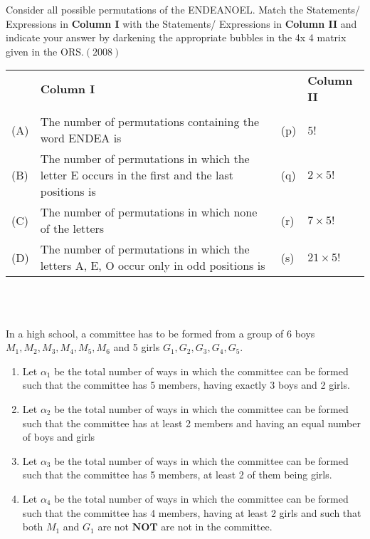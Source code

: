 \iffalse
  \title{Permutations And Combinations}
  \author{BALAJI B}
  \section{matrix-match}
\fi


    \item Consider all possible permutations of the ENDEANOEL. Match the Statements/ Expressions in
\textbf{Column I} with the Statements/ Expressions in \textbf{Column II} and indicate your answer by darkening
the appropriate bubbles in the 4x 4 matrix given in the ORS.\hfill $(2008)$\\  
    




\begin{tabular}{p{0.5cm}p{9cm}p{1.5cm}p{2cm}}
& \textbf{Column I } & & \textbf{Column II}\\ \\
 (A) & The number of permutations containing the word ENDEA is & \raggedleft (p) & 5! \\
    (B) & The number of permutations in which the letter E occurs in the first and the last positions is & \raggedleft(q) & $2\times{5!}$\\
    (C)& The number of permutations in which none of the letters & \raggedleft (r) &$7\times{5!}$\\
    (D) & The number of permutations in which the letters A, E, O occur only in odd positions is & \raggedleft (s) & $21\times{5!}$
    
\end{tabular}
\\ \\

\item In a high school, a committee has to be formed from a group of 6 boys $M_1,M_2,M_3,M_4,M_5,M_6$ and 5 girls $G_1,G_2,G_3,G_4,G_5$.

\begin{enumerate}
    \item Let $\alpha_1$ be the total number of ways in which the committee can be formed such that the committee has 5 members, having exactly 3 boys and 2 girls. 
    \item Let $\alpha_2$ be the total number of ways in which the committee can be formed such that the committee has at least 2 members and having an equal number of boys and girls
    \item Let $\alpha_3$ be the total number of ways in which the committee can be formed such that the committee has 5 members, at least 2 of them being girls. 
    \item Let $\alpha_4$ be the total number of ways in which the committee can be formed such that the committee has 4 members, having at least 2 girls and such that both $M_1$ and $G_1$ are not $\mathbf{NOT} $ are not in the committee. \\
\end{enumerate}

